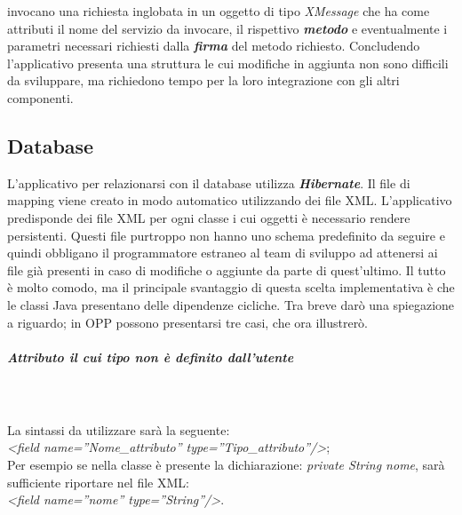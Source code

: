 invocano una richiesta inglobata in un oggetto di tipo \textit{XMessage} che ha come attributi il nome del servizio da invocare, il rispettivo \textit{\textbf{metodo}} e eventualmente i parametri necessari richiesti dalla \textit{\textbf{firma}} del metodo richiesto. Concludendo l\textquoteright{}applicativo presenta una struttura le cui modifiche in aggiunta non sono difficili da sviluppare, ma richiedono tempo per la loro integrazione con gli altri componenti. 

\subsection{Database}
L\textquoteright{}applicativo per relazionarsi con il database utilizza \textit{\textbf{Hibernate}}. Il file di mapping viene creato in modo automatico utilizzando dei file XML. L\textquoteright{}applicativo predisponde dei file XML per ogni classe i cui oggetti \`{e} necessario rendere persistenti. Questi file purtroppo non hanno uno schema predefinito da seguire e quindi obbligano il programmatore estraneo al team di sviluppo ad attenersi ai file gi\`{a} presenti in caso di modifiche o aggiunte da parte di quest\textquoteright{}ultimo. Il tutto \`{e} molto comodo, ma il principale svantaggio di questa scelta implementativa \`{e} che le classi Java presentano delle dipendenze cicliche. Tra breve dar\`{o} una spiegazione a riguardo; in OPP possono presentarsi tre casi, che ora illustrer\`{o}.

\subparagraph{Attributo il cui tipo non \`{e} definito dall\textquoteright{}utente} \quad \quad \\ \\
La sintassi da utilizzare sar\`{a} la seguente: \\
\textit{<field name=''Nome\_attributo'' type=''Tipo\_attributo''/>}; \\
Per esempio se nella classe \`{e} presente la dichiarazione: \textit{private String nome}, sar\`{a} sufficiente riportare nel file XML: \\
\textit{<field name=''nome'' type=''String''/>}.


